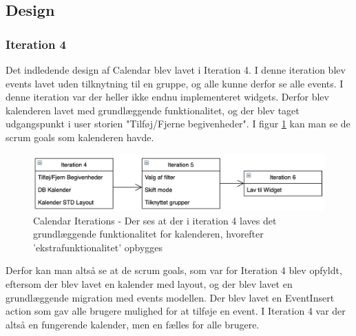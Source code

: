 
\subsection{Design}

\subsubsection{Iteration 4}
Det indledende design af Calendar blev lavet i Iteration 4. I denne iteration blev events lavet uden tilknytning til en gruppe, og alle kunne derfor se alle events. I denne iteration var der heller ikke endnu implementeret widgets. Derfor blev kalenderen lavet med grundlæggende funktionalitet, og der blev taget udgangspunkt i user storien "Tilføj/Fjerne begivenheder".\newline
I figur \ref{fig:CalendarIterations} kan man se de scrum goals som kalenderen havde.

\begin{figure}[H]
    \centering
    \includegraphics[width=1\linewidth]{10_Design_og_implementering/Calendar/Images/CalendarIterations.png}
    \caption{Calendar Iterations - Der ses at der i iteration 4 laves det grundlæggende funktionalitet for kalenderen, hvorefter 'ekstrafunktionalitet' opbygges}
    \label{fig:CalendarIterations}
\end{figure}{}


Derfor kan man altså se at de scrum goals, som var for Iteration 4 blev opfyldt, eftersom der blev lavet en kalender med layout, og der blev lavet en grundlæggende migration med events modellen. Der blev lavet en EventInsert action som gav alle brugere mulighed for at tilføje en event. I Iteration 4 var der altså en fungerende kalender, men en fælles for alle brugere. \newline

